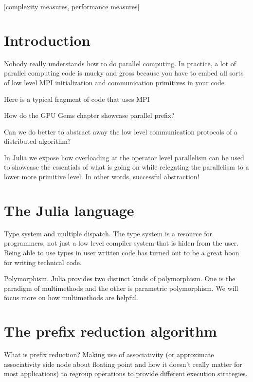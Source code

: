 \documentclass{sig-alternate}
\begin{document}
[complexity measures, performance measures]



\section{Introduction}
Nobody really understands how to do parallel computing. In practice, a lot of parallel computing code is mucky and gross because you have to embed all sorts of low level MPI initialization and communication primitives in your code.

Here is a typical fragment of code that uses MPI

How do the GPU Gems chapter showcase parallel prefix?

Can we do better to abstract away the low level communication protocols of a distributed algorithm?

In Julia we expose how overloading at the operator level parallelism can be used to showcase the essentials of what is going on while relegating the parallelism to a lower more primitive level. In other words, successful abstraction!

\section{The Julia language}

Type system and multiple dispatch. The type system is a resource for programmers, not just a low level compiler system that is hiden from the user. Being able to use types in user written code has turned out to be a great boon for writing technical code.

Polymorphism. Julia provides two distinct kinds of polymorphism. One is the paradigm of multimethods and the other is parametric polymorphism. We will focus more on how multimethods are helpful.

\section{The prefix reduction algorithm}

What is prefix reduction? Making use of associativity (or approximate associativity side node about floating point and how it doesn't really matter for most applications)  to regroup operations to provide different execution strategies.
\end{document}
